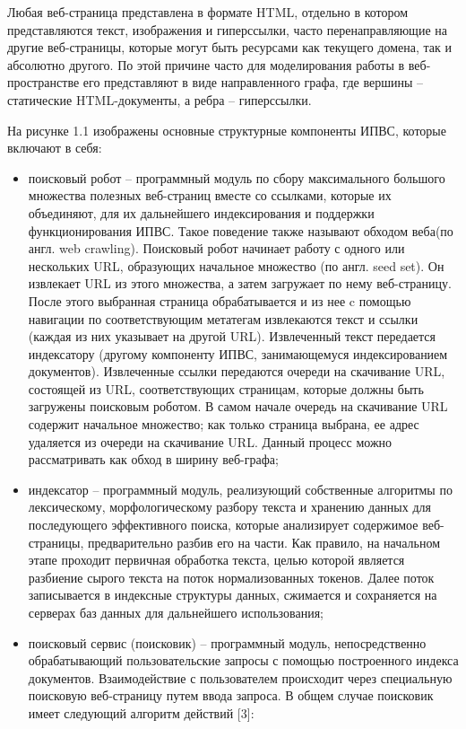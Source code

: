 Любая веб-страница представлена в формате HTML, отдельно в котором представляются текст, изображения и гиперссылки, часто перенаправляющие на другие веб-страницы, которые могут быть ресурсами как текущего домена, так и абсолютно другого. По этой причине часто для моделирования работы в веб-пространстве его представляют в виде направленного графа, где вершины -- статические HTML-документы, а ребра -- гиперссылки.

На рисунке 1.1 изображены основные структурные компоненты ИПВС, которые включают в себя:
\begin{itemize}
\item поисковый робот -- программный модуль по сбору максимального большого множества полезных веб-страниц вместе со ссылками, которые их объединяют, для их дальнейшего индексирования и поддержки функционирования ИПВС. Такое поведение также называют обходом веба(по англ. web crawling). Поисковый робот начинает работу с одного или нескольких URL, образующих начальное множество (по англ. seed set). Он извлекает URL из этого множества, а затем загружает по нему веб-страницу. После этого выбранная страница обрабатывается и из нее c помощью навигации по соответствующим метатегам извлекаются текст и ссылки  (каждая из них указывает на другой URL). Извлеченный текст передается индексатору (другому компоненту ИПВС, занимающемуся индексированием документов). Извлеченные ссылки передаются очереди на скачивание URL, состоящей из URL, соответствующих страницам, которые должны быть загружены поисковым роботом. В самом начале очередь на скачивание URL содержит начальное множество; как только страница выбрана, ее адрес удаляется из очереди на скачивание URL. Данный процесс можно рассматривать как обход в ширину веб-графа;
\item индексатор -- программный модуль, реализующий собственные алгоритмы по лексическому, морфологическому разбору текста и хранению данных для последующего эффективного поиска, которые анализирует содержимое веб-страницы, предварительно разбив его на части. Как правило, на начальном этапе проходит первичная обработка текста, целью которой является разбиение сырого текста на поток нормализованных токенов. Далее поток записывается в индексные структуры данных, сжимается и сохраняется на серверах баз данных для дальнейшего использования;
\item поисковый сервис (поисковик) -- программный модуль, непосредственно обрабатывающий пользовательские запросы с помощью построенного индекса документов. Взаимодействие с пользователем происходит через специальную поисковую веб-страницу путем ввода запроса. В общем случае поисковик имеет следующий алгоритм действий [3]:

\end{itemize}
